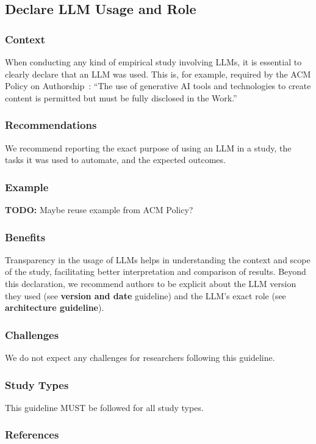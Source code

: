 \documentclass[11pt]{article}
\begin{document}
\subsection{Declare LLM Usage and Role}

\subsubsection{Context}

When conducting any kind of empirical study involving LLMs, it is essential to clearly declare that an LLM was used.
This is, for example, required by the ACM Policy on Authorship~\cite{ACM2023}: ``The use of generative AI tools and technologies to create content is permitted but must be fully disclosed in the Work.''

\subsubsection{Recommendations}

We recommend reporting the exact purpose of using an LLM in a study, the tasks it was used to automate, and the expected outcomes.

\subsubsection{Example}

\textbf{TODO: } Maybe reuse example from ACM Policy?

\subsubsection{Benefits}

Transparency in the usage of LLMs helps in understanding the context and scope of the study, facilitating better interpretation and comparison of results.
Beyond this declaration, we recommend authors to be explicit about the LLM version they used (see \textbf{version and date} guideline) and the LLM's exact role (see \textbf{architecture guideline}).

\subsubsection{Challenges}

We do not expect any challenges for researchers following this guideline.

\subsubsection{Study Types}

This guideline MUST be followed for all study types.

\subsubsection{References}



\end{document}
